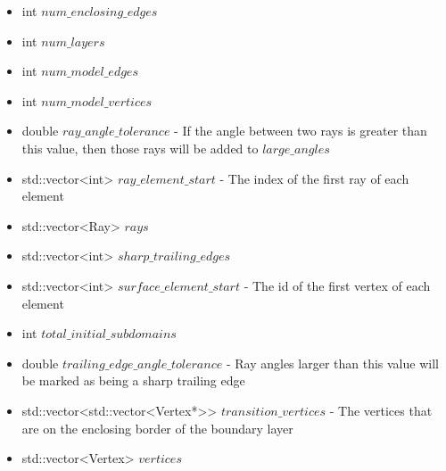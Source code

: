 \documentclass[manuscript, screen]{acmart}
\begin{document}
\begin{itemize}
\item int $num\_enclosing\_edges$
\item int $num\_layers$
\item int $num\_model\_edges$
\item int $num\_model\_vertices$
\item double $ray\_angle\_tolerance$ - If the angle between two rays is greater than this value, then those rays will be added to $large\_angles$
\item std::vector<int> $ray\_element\_start$ - The index of the first ray of each element
\item std::vector<Ray> $rays$
\item std::vector<int> $sharp\_trailing\_edges$
\item std::vector<int> $surface\_element\_start$ - The id of the first vertex of each element
\item int $total\_initial\_subdomains$
\item double $trailing\_edge\_angle\_tolerance$ - Ray angles larger than this value will be marked as being a sharp trailing edge
\item std::vector<std::vector<Vertex*>> $transition\_vertices$ - The vertices that are on the enclosing border of the boundary layer
\item std::vector<Vertex> $vertices$
\end{itemize}
\end{document}
